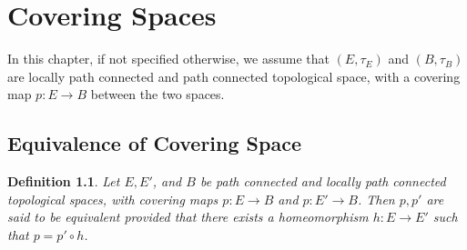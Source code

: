 \documentclass[11pt]{book}
\theoremstyle{break}
\theoremstyle{break}
\newtheorem{defn}{Definition}[corL]
\begin{document}
\chapter[Covering Spaces]{Covering Spaces}
\setcounter{section}{23}
In this chapter, if not specified otherwise, we assume that $(E,\tau_E)$ and $(B,\tau_B)$ are locally path connected and path connected topological space, with a covering map $p:E \to B$ between the two spaces.\\

\section[Equivalence of Covering Space]{\color{red} Equivalence of Covering Space \color{black}}
\begin{defn}
Let $E,E'$, and $B$ be path connected and locally path connected topological spaces, with covering maps $p:E \to B$ and $p:E' \to B$. Then $p, p'$ are said to be equivalent provided that there exists a homeomorphism $h:E\to E'$ such that $p = p' \circ h$. 
\end{defn}
\end{document}
